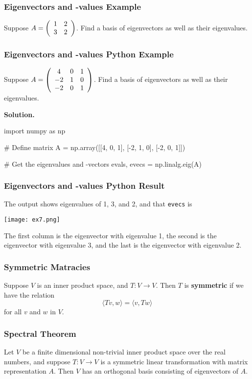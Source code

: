 \documentclass{beamer}
\begin{document}
\begin{frame}[t]
\frametitle{Eigenvectors and -values Example}
\begin{Example}
Suppose $A = \left(\begin{array}{c c} 1	&	2\\	3	&	2\end{array}\right)$. Find a basis of eigenvectors as well as their eigenvalues.
\end{Example}

\end{frame}


\begin{frame}[fragile]
\frametitle{Eigenvectors and -values Python Example}
\begin{Example}
Suppose $A = \left(\begin{array}{c c c} 4	&	0	&	1\\	-2	&1	&	0\\	-2	&	0	& 1\end{array}\right)$. Find a basis of eigenvectors as well as their eigenvalues.
\end{Example}

{\bf Solution.}  
{\tiny
\begin{verbatim*}
import numpy as np

# Define matrix 
A = np.array([[4, 0, 1], [-2, 1, 0], [-2, 0, 1]])

# Get the eigenvalues and -vectors
evals, evecs = np.linalg.eig(A)
\end{verbatim*}
}


\end{frame}

\begin{frame}
\frametitle{Eigenvectors and -values Python Result}
The output shows eigenvalues of 1, 3, and 2, and that \texttt{evecs} is
\begin{center}
\texttt{[image: ex7.png]}
\end{center}
The first column is the eigenvector with eigenvalue 1, the second is the eigenvector with eigenvalue 3, and the last is the eigenvector with eigenvalue 2.
\end{frame}

\begin{frame}
\frametitle{Symmetric Matracies}
\begin{Definition}
Suppose $V$ is an inner product space, and $T:V\to V$. Then $T$ is {\bf symmetric} if we have the relation
$$
\langle Tv, w\rangle = \langle v, Tw\rangle
$$
for all $v$ and $w$ in $V$. 
\end{Definition}

\end{frame}

\begin{frame}
\frametitle{Spectral Theorem}

\begin{Theorem}
Let $V$ be a finite dimensional non-trivial inner product space over the real numbers, and suppose $T:V\to V$ is a symmetric linear transformation with matrix representation $A$. Then $V$ has an orthogonal basis consisting of eigenvectors of $A$.
\end{Theorem}


\end{frame}
\end{document}
